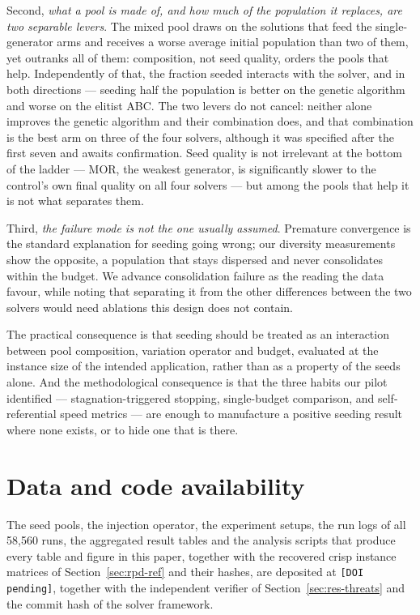 \documentclass[review]{elsarticle}
\begin{document}
Second, \emph{what a pool is made of, and how much of the population it
replaces, are two separable levers}. The mixed pool draws on the solutions
that feed the single-generator arms and receives a worse average initial
population than two of them, yet outranks all of them: composition, not
seed quality, orders the pools that help. Independently of that, the
fraction seeded interacts with the solver, and in both directions ---
seeding half the population is better on the genetic algorithm and worse on
the elitist ABC. The two levers do not cancel: neither alone improves the
genetic algorithm and their combination does, and that combination is the
best arm on three of the four solvers, although it was specified after the
first seven and awaits confirmation. Seed quality is
not irrelevant at the bottom of the ladder --- MOR, the weakest generator,
is significantly slower to the control's own final quality on all four
solvers --- but among the pools that help it is not what separates them.

Third, \emph{the failure mode is not the one usually assumed}. Premature
convergence is the standard explanation for seeding going wrong; our
diversity measurements show the opposite, a population that stays dispersed
and never consolidates within the budget. We advance consolidation failure
as the reading the data favour, while noting that separating it from the
other differences between the two solvers would need ablations this design
does not contain.

The practical consequence is that seeding should be treated as an
interaction between pool composition, variation operator and budget,
evaluated at the instance size of the intended application, rather than as
a property of the seeds alone. And the methodological consequence is that
the three habits our pilot identified --- stagnation-triggered stopping,
single-budget comparison, and self-referential speed metrics --- are enough
to manufacture a positive seeding result where none exists, or to hide one
that is there.

\section*{Data and code availability}
The seed pools, the injection operator, the experiment setups, the run
logs of all 58{,}560 runs, the aggregated result tables and the analysis
scripts that produce every table and figure in this paper, together with the
recovered crisp instance matrices of Section~\ref{sec:rpd-ref} and their
hashes, are deposited at
\texttt{[DOI pending]}, together with the independent verifier of
Section~\ref{sec:res-threats} and the commit hash of the solver framework.



\end{document}
